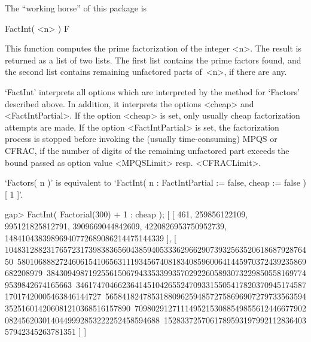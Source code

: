 The ``working horse'' of this package is


\>FactInt( <n> ) F

This function computes the prime factorization of the integer <n>.
The result is returned as a list of two lists. The first list
contains the prime factors found, and the second list contains remaining 
unfactored parts of~<n>, if there are any.

`FactInt' interprets all options which are interpreted by the method
for `Factors' described above. In addition, it interprets the options
<cheap> and <FactIntPartial>. If the option <cheap> is set, only usually
cheap factorization attempts are made. If the option <FactIntPartial>
is set, the factorization process is stopped before invoking the
(usually time-consuming) MPQS or CFRAC, if the number of digits of the
remaining unfactored part exceeds the bound passed as option value
<MPQSLimit> resp. <CFRACLimit>.

`Factors( n )' is equivalent to
`FactInt( n : FactIntPartial := false, cheap := false )[ 1 ]'.

\beginexample
gap> FactInt( Factorial(300) + 1 : cheap );
[ [ 461, 259856122109, 995121825812791, 3909669044842609, 4220826953750952739,
      14841043839896940772689086214475144339 ],
  [ 10483128823176572317398383656043859405333629662907393256352061868792876450\
580106888272460615410656311193456740818340859600641445970372439235869682208979\
384309498719255615067943353399357029226058930732298505581697749539842674165663\
346174704662364145104265524709331550541782037094517458717017420005463846144727\
565841824785318809625948572758696907279733563594352516014206081210368516157890\
709802912711149521530885498556124466779020824562030140449992853222252458594688\
152833725706178959319799211283640357942345263781351 ] ]
\endexample

